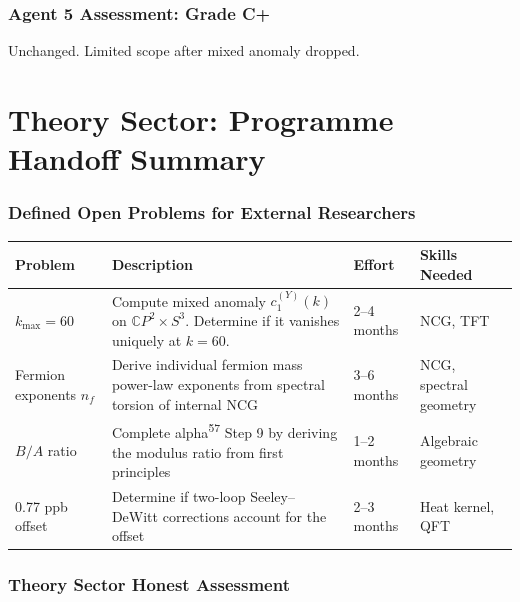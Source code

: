 \documentclass[11pt,a4paper]{article}
\newcommand{\CP}{\mathbb{C}P}
\begin{document}
\section{Agent 5 Assessment: Grade C+}

Unchanged. Limited scope after mixed anomaly dropped.


\part{Theory Sector: Programme Handoff Summary}
\label{part:handoff}

\section{Defined Open Problems for External Researchers}

\begin{center}
\begin{longtable}{p{3cm}p{6cm}p{2cm}p{2.5cm}}
\toprule
\textbf{Problem} & \textbf{Description} & \textbf{Effort} & \textbf{Skills Needed} \\
\midrule
\endfirsthead
$k_{\max} = 60$ & Compute mixed anomaly $c_1^{(Y)}(k)$ on $\CP^2 \times S^3$. Determine if it vanishes uniquely at $k = 60$. & 2--4 months & NCG, TFT \\
Fermion exponents $n_f$ & Derive individual fermion mass power-law exponents from spectral torsion of internal NCG & 3--6 months & NCG, spectral geometry \\
$B/A$ ratio & Complete alpha\textsuperscript{57} Step 9 by deriving the modulus ratio from first principles & 1--2 months & Algebraic geometry \\
0.77 ppb offset & Determine if two-loop Seeley--DeWitt corrections account for the offset & 2--3 months & Heat kernel, QFT \\
\bottomrule
\end{longtable}
\end{center}

\section{Theory Sector Honest Assessment}
\end{document}
